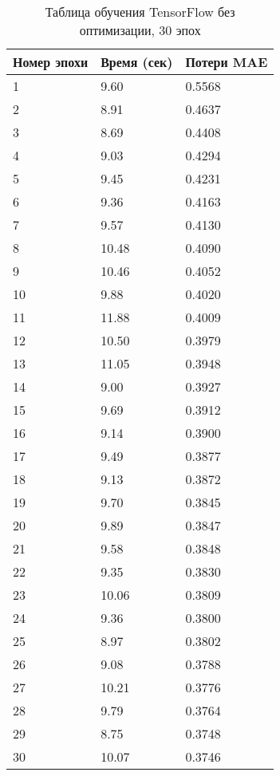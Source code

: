 \documentclass[a4paper,12pt,titlepage,final]{article}
\begin{document}
\begin{table}[H]
\centering
\begin{tabular}{|p{6.4cm}|p{3.2cm}|p{3.2cm}|}
\hline
Номер эпохи & Время (сек) & Потери MAE \\
\hline
1 & 9.60 & 0.5568 \\ [1.5ex]
\hline
2 & 8.91 & 0.4637 \\ [1.5ex]
\hline
3 & 8.69 & 0.4408 \\ [1.5ex]
\hline
4 & 9.03 & 0.4294 \\ [1.5ex]
\hline
5 & 9.45 & 0.4231 \\ [1.5ex]
\hline
6 & 9.36 & 0.4163 \\ [1.5ex]
\hline
7 & 9.57 & 0.4130 \\ [1.5ex]
\hline
8 & 10.48 & 0.4090 \\ [1.5ex]
\hline
9 & 10.46 & 0.4052 \\ [1.5ex]
\hline
10 & 9.88 & 0.4020 \\ [1.5ex]
\hline
11 & 11.88 & 0.4009 \\ [1.5ex]
\hline
12 & 10.50 & 0.3979 \\ [1.5ex]
\hline
13 & 11.05 & 0.3948 \\ [1.5ex]
\hline
14 & 9.00 & 0.3927 \\ [1.5ex]
\hline
15 & 9.69 & 0.3912 \\ [1.5ex]
\hline
16 & 9.14 & 0.3900 \\ [1.5ex]
\hline
17 & 9.49 & 0.3877 \\[1.5ex]
\hline
18 & 9.13 & 0.3872 \\ [1.5ex]
\hline
19 & 9.70 & 0.3845 \\ [1.5ex]
\hline
20 & 9.89 & 0.3847 \\ [1.5ex]
\hline
21 & 9.58 & 0.3848 \\ [1.5ex]
\hline
22 & 9.35 & 0.3830 \\ [1.5ex]
\hline
23 & 10.06 & 0.3809 \\ [1.5ex]
\hline
24 & 9.36 & 0.3800 \\ [1.5ex]
\hline
25 & 8.97 & 0.3802 \\ [1.5ex]
\hline
26 & 9.08 & 0.3788 \\ [1.5ex]
\hline
27 & 10.21 & 0.3776 \\ [1.5ex]
\hline
28 & 9.79 & 0.3764 \\ [1.5ex]
\hline
29 & 8.75 & 0.3748 \\ [1.5ex]
\hline
30 & 10.07 & 0.3746 \\ [1.5ex]
\hline
\end{tabular}
\caption{Таблица обучения TensorFlow без оптимизации, 30 эпох}
\label{table3}
\end{table}
\end{document}
